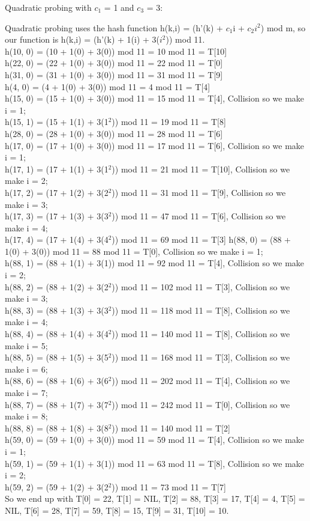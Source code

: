 \documentclass[12pt]{article}
\begin{document}
\begin{enumerate}
Quadratic probing with $c_1$ = 1 and $c_3$ = 3:

Quadratic probing uses the hash function h(k,i) = (h'(k) + $c_1$i + $c_2i^2$) mod m, so our function is 
h(k,i) = (h'(k) + 1(i) + 3($i^2$)) mod 11.\\

h(10, 0) = (10 + 1(0) + 3(0)) mod 11 = 10 mod 11 = T[10]\\
h(22, 0) = (22 + 1(0) + 3(0)) mod 11 = 22 mod 11 = T[0]\\
h(31, 0) = (31 + 1(0) + 3(0)) mod 11 = 31 mod 11 = T[9]\\
h(4, 0) = (4 + 1(0) + 3(0)) mod 11 = 4 mod 11 = T[4]\\
h(15, 0) = (15 + 1(0) + 3(0)) mod 11 = 15 mod 11 = T[4], Collision so we make i = 1;\\
h(15, 1) = (15 + 1(1) + 3(1$^2$)) mod 11 = 19 mod 11 = T[8]\\
h(28, 0) = (28 + 1(0) + 3(0)) mod 11 = 28 mod 11 = T[6]\\
h(17, 0) = (17 + 1(0) + 3(0)) mod 11 = 17 mod 11 = T[6], Collision so we make i = 1;\\
h(17, 1) = (17 + 1(1) + 3(1$^2$)) mod 11 = 21 mod 11 = T[10], Collision so we make i = 2;\\
h(17, 2) = (17 + 1(2) + 3(2$^2$)) mod 11 = 31 mod 11 = T[9], Collision so we make i = 3;\\
h(17, 3) = (17 + 1(3) + 3(3$^2$)) mod 11 = 47 mod 11 = T[6], Collision so we make i = 4;\\
h(17, 4) = (17 + 1(4) + 3(4$^2$)) mod 11 = 69 mod 11 = T[3]
h(88, 0) = (88 + 1(0) + 3(0)) mod 11 = 88 mod 11 = T[0], Collision so we make i = 1;\\
h(88, 1) = (88 + 1(1) + 3(1)) mod 11 = 92 mod 11 = T[4], Collision so we make i = 2;\\
h(88, 2) = (88 + 1(2) + 3(2$^2$)) mod 11 = 102 mod 11 = T[3], Collision so we make i = 3;\\
h(88, 3) = (88 + 1(3) + 3(3$^2$)) mod 11 = 118 mod 11 = T[8], Collision so we make i = 4;\\
h(88, 4) = (88 + 1(4) + 3(4$^2$)) mod 11 = 140 mod 11 = T[8], Collision so we make i = 5;\\
h(88, 5) = (88 + 1(5) + 3(5$^2$)) mod 11 = 168 mod 11 = T[3], Collision so we make i = 6;\\
h(88, 6) = (88 + 1(6) + 3(6$^2$)) mod 11 = 202 mod 11 = T[4], Collision so we make i = 7;\\
h(88, 7) = (88 + 1(7) + 3(7$^2$)) mod 11 = 242 mod 11 = T[0], Collision so we make i = 8;\\
h(88, 8) = (88 + 1(8) + 3(8$^2$)) mod 11 = 140 mod 11 = T[2]\\
h(59, 0) = (59 + 1(0) + 3(0)) mod 11 = 59 mod 11 = T[4], Collision so we make i = 1;\\
h(59, 1) = (59 + 1(1) + 3(1)) mod 11 = 63 mod 11 = T[8], Collision so we make i = 2;\\
h(59, 2) = (59 + 1(2) + 3(2$^2$)) mod 11 = 73 mod 11 = T[7]\\
So we end up with T[0] = 22, T[1] = NIL, T[2] = 88, T[3] = 17, T[4] = 4, T[5] = NIL, T[6] = 28, T[7] = 59, T[8] = 15, T[9] = 31, T[10] = 10. \\


\end{enumerate}
\end{document}
